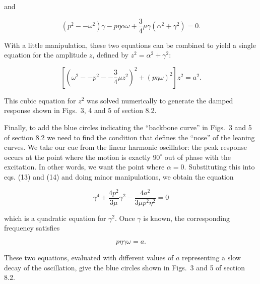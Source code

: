  \noindent{}and 

  \begin{equation*}(p^2 -- \omega^2) \gamma -p \eta \alpha \omega +\frac{3}{4} 
  \mu \gamma (\alpha^2 + \gamma^2) = 0 . \tag{14}\end{equation*} 

  With a little manipulation, these two equations can be combined to yield a 
  single equation for the amplitude $z$, defined by $z^2=\alpha^2 + \gamma^2$: 

  \begin{equation*}\left[ \left(\omega^2 -- p^2 -- \frac{3}{4} \mu z^2 
  \right)^2 + (p \eta \omega)^2 \right] z^2 = a^2. \tag{15}\end{equation*} 

  This cubic equation for $z^2$ was solved numerically to generate the damped 
  response shown in Figs.\ 3, 4 and 5 of section 8.2. 

  Finally, to add the blue circles indicating the ``backbone curve'' in Figs.\ 
  3 and 5 of section 8.2 we need to find the condition that defines the 
  ``nose'' of the leaning curves. We take our cue from the linear harmonic 
  oscillator: the peak response occurs at the point where the motion is exactly 
  $90^\circ$ out of phase with the excitation. In other words, we want the 
  point where $\alpha = 0$. Substituting this into eqs. (13) and (14) and doing 
  minor manipulations, we obtain the equation 

  \begin{equation*}\gamma^4 +\dfrac{4p^2}{3 \mu} \gamma^2 -\dfrac{4a^2}{3 \mu 
  p^2 \eta^2}=0 \tag{16}\end{equation*} 

  \noindent{}which is a quadratic equation for $\gamma^2$. Once $\gamma$ is 
  known, the corresponding frequency satisfies 

  \begin{equation*}p \eta \gamma \omega = a. \tag{17}\end{equation*} 

  These two equations, evaluated with different values of $a$ representing a 
  slow decay of the oscillation, give the blue circles shown in Figs.\ 3 and 5 
  of section 8.2. 